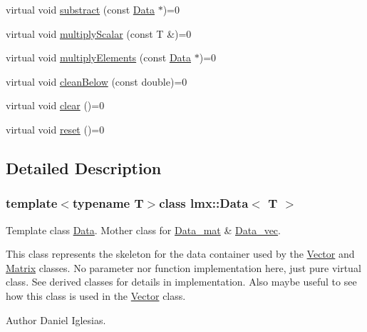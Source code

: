 \begin{DoxyCompactItemize}
\item 
virtual void \hyperlink{classlmx_1_1Data_aab240114cfc6ba8f342cc7154dcb298d}{substract} (const \hyperlink{classlmx_1_1Data}{Data} $\ast$)=0
\item 
virtual void \hyperlink{classlmx_1_1Data_a027c8e7cb440f16a828579acaf991262}{multiply\-Scalar} (const T \&)=0
\item 
virtual void \hyperlink{classlmx_1_1Data_a89fd82cd33955de1ee375a9d514f2860}{multiply\-Elements} (const \hyperlink{classlmx_1_1Data}{Data} $\ast$)=0
\item 
virtual void \hyperlink{classlmx_1_1Data_a706e90ec786d6133dd69edcbc6b37845}{clean\-Below} (const double)=0
\item 
virtual void \hyperlink{classlmx_1_1Data_abab7ff41198c0fab10e2a7d739e47ecb}{clear} ()=0
\item 
virtual void \hyperlink{classlmx_1_1Data_a2d275a49db8c274e26b1d3bcbc23d964}{reset} ()=0
\end{DoxyCompactItemize}


\subsection{Detailed Description}
\subsubsection*{template$<$typename T$>$class lmx\-::\-Data$<$ T $>$}

Template class \hyperlink{classlmx_1_1Data}{Data}. Mother class for \hyperlink{classlmx_1_1Data__mat}{Data\-\_\-mat} \& \hyperlink{classlmx_1_1Data__vec}{Data\-\_\-vec}. 

This class represents the skeleton for the data container used by the \hyperlink{classlmx_1_1Vector}{Vector} and \hyperlink{classlmx_1_1Matrix}{Matrix} classes. No parameter nor function implementation here, just pure virtual class. See derived classes for details in implementation. Also maybe useful to see how this class is used in the \hyperlink{classlmx_1_1Vector}{Vector} class.

\begin{DoxyAuthor}{Author}
Daniel Iglesias. 
\end{DoxyAuthor}



